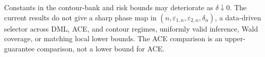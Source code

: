 Constants in the contour-bank and risk bounds may deteriorate as \(\delta\downarrow0\).  The current results do not give a sharp phase map in \((n,\varepsilon_{1,n},\varepsilon_{2,n},\delta_n)\), a data-driven selector across DML, ACE, and contour regimes, uniformly valid inference, Wald coverage, or matching local lower bounds.  The ACE comparison is an upper-guarantee comparison, not a lower bound for ACE.